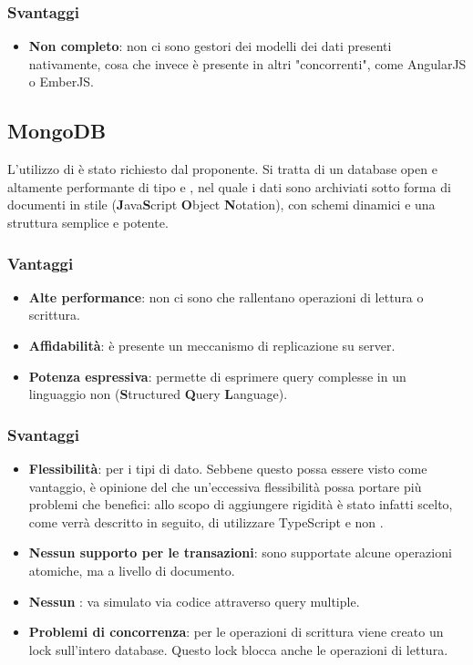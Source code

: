 \subsubsection{Svantaggi}
\begin{itemize}
\item \textbf{Non completo}: non ci sono gestori dei modelli dei dati presenti nativamente, cosa che invece è presente in altri  "concorrenti", come AngularJS o EmberJS.
\end{itemize}
\subsection{MongoDB}
L'utilizzo di  \`e stato richiesto dal proponente. Si tratta di un database  open   e altamente performante di tipo  e , nel quale i dati sono archiviati sotto forma di documenti in stile  (\textbf{J}ava\textbf{S}cript \textbf{O}bject \textbf{N}otation), con schemi dinamici e una struttura semplice e potente.
\subsubsection{Vantaggi}
\begin{itemize}
\item \textbf{Alte performance}: non ci sono  che rallentano operazioni di lettura o scrittura. 
\item \textbf{Affidabilità}: \`e presente un meccanismo di replicazione su server.
\item \textbf{Potenza espressiva}: permette di esprimere query complesse in un linguaggio non  (\textbf{S}tructured \textbf{Q}uery \textbf{L}anguage).
\end{itemize}
\subsubsection{Svantaggi}
\begin{itemize}
\item \textbf{Flessibilità}: per i tipi di dato. Sebbene questo possa essere visto come vantaggio, è opinione del  che un'eccessiva flessibilità possa portare più problemi che benefici: allo scopo di aggiungere rigidità è stato infatti scelto, come verrà descritto in seguito, di utilizzare TypeScript e non .
\item \textbf{Nessun supporto per le transazioni}: sono supportate alcune operazioni atomiche, ma a livello di documento.
\item \textbf{Nessun }: va simulato via codice attraverso query multiple.
\item \textbf{Problemi di concorrenza}: per le operazioni di scrittura viene creato un lock sull'intero database. Questo lock blocca anche le operazioni di lettura.
\end{itemize}
